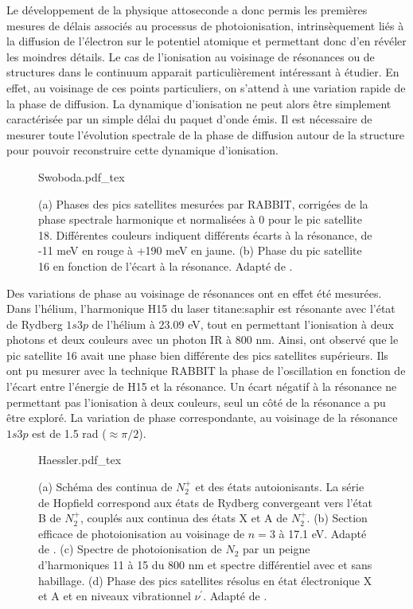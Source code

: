 Le développement de la physique attoseconde a donc permis les premières mesures de délais associés au processus de photoionisation, intrinsèquement liés à la diffusion de l'électron sur le potentiel atomique et permettant donc d'en révéler les moindres détails. Le cas de l'ionisation au voisinage de résonances ou de structures dans le continuum apparait particulièrement intéressant à étudier. En effet, au voisinage de ces points particuliers, on s'attend à une variation rapide de la phase de diffusion. La dynamique d'ionisation ne peut alors être simplement caractérisée par un simple délai du paquet d'onde émis. Il est nécessaire de mesurer toute l'évolution spectrale de la phase de diffusion autour de la structure pour pouvoir reconstruire cette dynamique d'ionisation.

\begin{figure}
\centering
\def\svgwidth{0.8\textwidth}
{Swoboda.pdf_tex}
\caption{(a) Phases des pics satellites mesurées par RABBIT, corrigées de la phase spectrale harmonique et normalisées à 0 pour le pic satellite 18. Différentes couleurs indiquent différents écarts à la résonance, de -11 meV en rouge à +190 meV en jaune. (b) Phase du pic satellite 16 en fonction de l'écart à la résonance. Adapté de .}
\label{fig:Swoboda}
\end{figure}

Des variations de phase au voisinage de résonances ont en effet été mesurées. Dans l'hélium, l'harmonique H15 du laser titane:saphir est résonante avec l'état de Rydberg $1s3p$ de l'hélium à 23.09 eV, tout en permettant l'ionisation à deux photons et deux couleurs avec un photon IR à 800 nm. Ainsi,  ont observé que le pic satellite 16 avait une phase bien différente des pics satellites supérieurs. Ils ont pu mesurer avec la technique RABBIT la phase de l'oscillation en fonction de l'écart entre l'énergie de H15 et la résonance. Un écart négatif à la résonance ne permettant pas l'ionisation à deux couleurs, seul un côté de la résonance a pu être exploré. La variation de phase correspondante, au voisinage de la résonance $1s3p$ est de 1.5 rad ($\approx \pi/2$).

\begin{figure}
\centering
\def\svgwidth{\textwidth}
{Haessler.pdf_tex}
\caption{(a) Schéma des continua de $N_2^+$ et des états autoionisants. La série de Hopfield correspond aux états de Rydberg convergeant vers l'état B de $N_2^+$, couplés aux continua des états X et A de $N_2^+$. (b) Section efficace de photoionisation au voisinage de $n=3$ à 17.1 eV. Adapté de . (c) Spectre de photoionisation de $N_2$ par un peigne d'harmoniques 11 à 15 du 800 nm et spectre différentiel avec et sans habillage. (d) Phase des pics satellites résolus en état électronique X et A et en niveaux vibrationnel $\nu^{'}$. Adapté de .}
\label{fig:Haessler}
\end{figure}

